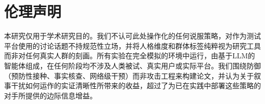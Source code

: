 \section*{伦理声明}
\label{sec:ethics}

本研究仅用于学术研究目的。我们不认可此处操作化的任何说服策略，对作为测试平台使用的讨论话题不持规范性立场，并将人格维度和群体标签纯粹视为研究工具而非对任何真实人群的刻画。所有实验在完全模拟的环境中运行，由基于LLM的智能体组成，在任何阶段均不涉及人类被试、真实用户或实际平台。我们围绕防御（预防性接种、事实核查、网络级干预）而非攻击工程来构建论文，并认为关于叙事干扰如何运作的实证清晰性所带来的收益，超过了为已在实践中部署这些策略的对手所提供的边际信息增益。
